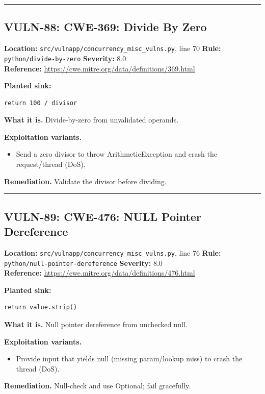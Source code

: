\documentclass[11pt,a4paper]{article}
\begin{document}
\vspace{4pt}\hrule\vspace{6pt}
\subsection{VULN-88: CWE-369: Divide By Zero}
\noindent\textbf{Location:} \texttt{src/vulnapp/concurrency\_misc\_vulns.py}, line 70 \quad \textbf{Rule:} \texttt{python/divide-by-zero} \quad \textbf{Severity:} 8.0
\\ \textbf{Reference:} \url{https://cwe.mitre.org/data/definitions/369.html}

\noindent\textbf{Planted sink:}
\begin{lstlisting}
return 100 / divisor
\end{lstlisting}
\noindent\textbf{What it is.} Divide-by-zero from unvalidated operands.

\noindent\textbf{Exploitation variants.}
\begin{itemize}[leftmargin=1.4em,itemsep=1pt,topsep=2pt]
\item Send a zero divisor to throw ArithmeticException and crash the request/thread (DoS).
\end{itemize}
\noindent\textbf{Remediation.} Validate the divisor before dividing.

\vspace{4pt}\hrule\vspace{6pt}
\subsection{VULN-89: CWE-476: NULL Pointer Dereference}
\noindent\textbf{Location:} \texttt{src/vulnapp/concurrency\_misc\_vulns.py}, line 76 \quad \textbf{Rule:} \texttt{python/null-pointer-dereference} \quad \textbf{Severity:} 8.0
\\ \textbf{Reference:} \url{https://cwe.mitre.org/data/definitions/476.html}

\noindent\textbf{Planted sink:}
\begin{lstlisting}
return value.strip()
\end{lstlisting}
\noindent\textbf{What it is.} Null pointer dereference from unchecked null.

\noindent\textbf{Exploitation variants.}
\begin{itemize}[leftmargin=1.4em,itemsep=1pt,topsep=2pt]
\item Provide input that yields null (missing param/lookup miss) to crash the thread (DoS).
\end{itemize}
\noindent\textbf{Remediation.} Null-check and use Optional; fail gracefully.
\end{document}
